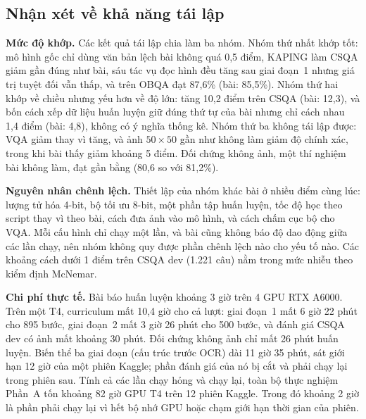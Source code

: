 \subsection{Nhận xét về khả năng tái lập}
\textbf{Mức độ khớp.} Các kết quả tái lập chia làm ba nhóm. Nhóm thứ nhất khớp tốt: mô hình gốc chỉ dùng văn bản lệch bài không quá 0,5 điểm, KAPING làm CSQA giảm gần đúng như bài, sáu tác vụ đọc hình đều tăng sau giai đoạn~1 nhưng giá trị tuyệt đối vẫn thấp, và \GV{} trên OBQA đạt 87,6\% (bài: 85,5\%). Nhóm thứ hai khớp về chiều nhưng yếu hơn về độ lớn: \GV{} tăng 10,2 điểm trên CSQA (bài: 12,3), và bốn cách xếp dữ liệu huấn luyện giữ đúng thứ tự của bài nhưng chỉ cách nhau 1,4 điểm (bài: 4,8), không có ý nghĩa thống kê. Nhóm thứ ba không tái lập được: VQA giảm thay vì tăng, và ảnh $50\times50$ gần như không làm giảm độ chính xác, trong khi bài thấy giảm khoảng 5 điểm. Đối chứng không ảnh, một thí nghiệm bài không làm, đạt gần bằng \GV{} (80,6 so với 81,2\%).

\textbf{Nguyên nhân chênh lệch.} Thiết lập của nhóm khác bài ở nhiều điểm cùng lúc: lượng tử hóa 4-bit, bộ tối ưu 8-bit, một phần tập huấn luyện, tốc độ học theo script thay vì theo bài, cách đưa ảnh vào mô hình, và cách chấm cục bộ cho VQA. Mỗi cấu hình chỉ chạy một lần, và bài cũng không báo độ dao động giữa các lần chạy, nên nhóm không quy được phần chênh lệch nào cho yếu tố nào. Các khoảng cách dưới 1 điểm trên CSQA dev (1.221 câu) nằm trong mức nhiễu theo kiểm định McNemar.

\textbf{Chi phí thực tế.} Bài báo huấn luyện khoảng 3 giờ trên 4 GPU RTX A6000. Trên một T4, \GV{} curriculum mất 10,4 giờ cho cả lượt: giai đoạn~1 mất 6 giờ 22 phút cho 895 bước, giai đoạn~2 mất 3 giờ 26 phút cho 500 bước, và đánh giá CSQA dev có ảnh mất khoảng 30 phút. Đối chứng không ảnh chỉ mất 26 phút huấn luyện. Biến thể ba giai đoạn (cấu trúc trước OCR) dài 11 giờ 35 phút, sát giới hạn 12 giờ của một phiên Kaggle; phần đánh giá của nó bị cắt và phải chạy lại trong phiên sau. Tính cả các lần chạy hỏng và chạy lại, toàn bộ thực nghiệm Phần~A tốn khoảng 82 giờ GPU T4 trên 12 phiên Kaggle. Trong đó khoảng 2 giờ là phần phải chạy lại vì hết bộ nhớ GPU hoặc chạm giới hạn thời gian của phiên.

